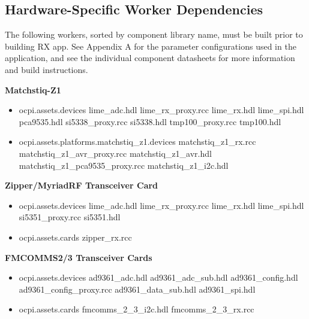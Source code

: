 \subsection{Hardware-Specific Worker Dependencies}
The following workers, sorted by component library name, must be built prior to building RX app. See Appendix A for the parameter configurations used in the application, and see the individual component datasheets for more information and build instructions.\par\bigskip
	\begin{minipage}[t]{.33\textwidth}
	\textbf{Matchstiq-Z1}
	\begin{itemize}
		\item ocpi.assets.devices
			\subitem lime\_adc.hdl
			\subitem lime\_rx\_proxy.rcc
			\subitem lime\_rx.hdl
			\subitem lime\_spi.hdl
			\subitem pca9535.hdl
			\subitem si5338\_proxy.rcc
			\subitem si5338.hdl
			\subitem tmp100\_proxy.rcc
			\subitem tmp100.hdl
		\item ocpi.assets.platforms.matchstiq\_z1.devices
			\subitem matchstiq\_z1\_rx.rcc
			\subitem matchstiq\_z1\_avr\_proxy.rcc
			\subitem matchstiq\_z1\_avr.hdl
			\subitem matchstiq\_z1\_pca9535\_proxy.rcc
			\subitem matchstiq\_z1\_i2c.hdl
	\end{itemize}
	\end{minipage}
	\begin{minipage}[t]{.33\textwidth}
	\textbf{Zipper/MyriadRF Transceiver Card}
	\begin{itemize}
		\item ocpi.assets.devices
			\subitem lime\_adc.hdl
			\subitem lime\_rx\_proxy.rcc
			\subitem lime\_rx.hdl
			\subitem lime\_spi.hdl
			\subitem si5351\_proxy.rcc
			\subitem si5351.hdl
	\end{itemize}
	\begin{itemize}
		\item ocpi.assets.cards
			\subitem zipper\_rx.rcc
	\end{itemize}
	\end{minipage} \medskip
	\begin{minipage}[t]{.33\textwidth}
	\textbf{FMCOMMS2/3 Transceiver Cards}
	\begin{itemize}
		\item ocpi.assets.devices
			\subitem ad9361\_adc.hdl
			\subitem ad9361\_adc\_sub.hdl
			\subitem ad9361\_config.hdl
			\subitem ad9361\_config\_proxy.rcc
			\subitem ad9361\_data\_sub.hdl
			\subitem ad9361\_spi.hdl
	\end{itemize}
	\begin{itemize}
		\item ocpi.assets.cards
			\subitem fmcomms\_2\_3\_i2c.hdl
			\subitem fmcomms\_2\_3\_rx.rcc
	\end{itemize}

	\end{minipage}
